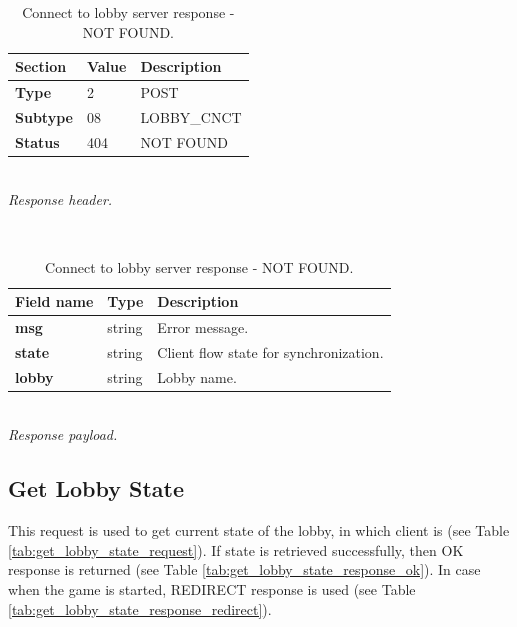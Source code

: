 \documentclass[english, sem, kiv, he, iso690alph, pdf, viewonly]{fasthesis}
\begin{document}
\begin{table}[h!]
	\centering
	\begin{minipage}[b]{1.0\textwidth}
		\centering
		\begin{tabular}{|l|l|l|}
			\hline
			\textbf{Section} & \textbf{Value} & \textbf{Description} \\ \hline
			\textbf{Type} & 2 & \footnotesize{POST} \\ \hline
			\textbf{Subtype} & 08 & \footnotesize{LOBBY\_CNCT}  \\ \hline
			\textbf{Status} & 404 & \footnotesize{NOT FOUND} \\ \hline
		\end{tabular} \\
		\textit{Response header.}
	\end{minipage} 
	\\
	\vspace{10pt}
	\begin{minipage}[b]{1.0\textwidth}
		\centering
		\begin{tabular}{|l|l|l|}
			\hline
			\textbf{Field name} & \textbf{Type} & \textbf{Description} \\ \hline
			\textbf{msg} & string & Error message. \\ \hline
			\textbf{state} & string & Client flow state for synchronization. \\ \hline
			\textbf{lobby} & string & Lobby name. \\ \hline
		\end{tabular} \\
		\textit{Response payload.}
	\end{minipage}	
	\caption{Connect to lobby server response - NOT FOUND.}
	\label{tab:connect_lobby_response_not_found}
\end{table}

\newpage

\subsection{Get Lobby State}

This request is used to get current state of the lobby, in which client is (see Table \ref{tab:get_lobby_state_request}). If state is retrieved successfully, then OK response is returned (see Table \ref{tab:get_lobby_state_response_ok}). In case when the game is started, REDIRECT response is used (see Table \ref{tab:get_lobby_state_response_redirect}).
\end{document}
